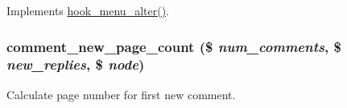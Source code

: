\label{comment_8module_a8ba809cd66487e3390673abf3fde59a9}
Implements \hyperlink{group__hooks_ga4c37deddcf48dbfe6f3081df1652f6fa}{hook\_\-menu\_\-alter()}. \hypertarget{comment_8module_a96371e6a82f797cdd2241ba5af50b590}{
\subsubsection[{comment\_\-new\_\-page\_\-count}]{\setlength{\rightskip}{0pt plus 5cm}comment\_\-new\_\-page\_\-count (\$ {\em num\_\-comments}, \/  \$ {\em new\_\-replies}, \/  \$ {\em node})}}
\label{comment_8module_a96371e6a82f797cdd2241ba5af50b590}
Calculate page number for first new comment.


